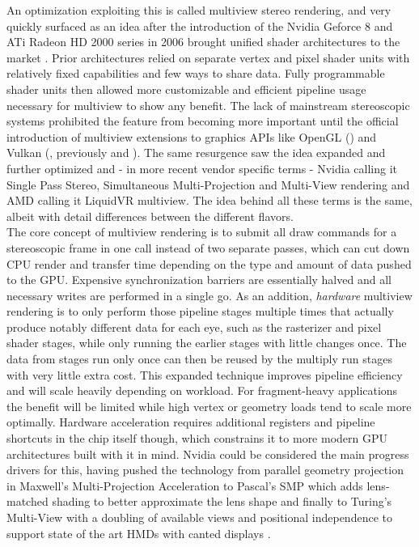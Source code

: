 An optimization exploiting this is called multiview stereo rendering, and very quickly surfaced as an idea after the introduction of the Nvidia Geforce 8 and ATi Radeon HD 2000 series in 2006 brought unified shader architectures to the market \cite{Lindholm.2008}\cite{Sommefeldt.2007}. Prior architectures relied on separate vertex and pixel shader units with relatively fixed capabilities and few ways to share data. Fully programmable shader units then allowed more customizable and efficient pipeline usage necessary for multiview to show any benefit. 
The lack of mainstream stereoscopic systems prohibited the feature from becoming more important until the official introduction of multiview extensions to graphics APIs like OpenGL () and Vulkan (, previously  and ). 
The same resurgence saw the idea expanded and further optimized and - in more recent vendor specific terms - Nvidia calling it Single Pass Stereo\cite{Cantlay.2016}, Simultaneous Multi-Projection\cite{Smith.2016} and Multi-View\cite{Bhonde.2018} rendering and AMD calling it LiquidVR multiview\cite{Gallagher.2016}\cite{Jez.2017}. The idea behind all these terms is the same, albeit with detail differences between the different flavors. \\

The core concept of multiview rendering is to submit all draw commands for a stereoscopic frame in one call instead of two separate passes, which can cut down CPU render and transfer time depending on the type and amount of data pushed to the GPU. Expensive synchronization barriers are essentially halved and all necessary writes are performed in a single go. 
As an addition, \textit{hardware} multiview rendering is to only perform those pipeline stages multiple times that actually produce notably different data for each eye, such as the rasterizer and pixel shader stages, while only running the earlier stages with little changes once. The data from stages run only once can then be reused by the multiply run stages with very little extra cost. This expanded technique improves pipeline efficiency and will scale heavily depending on workload. For fragment-heavy applications the benefit will be limited while high vertex or geometry loads tend to scale more optimally. Hardware acceleration requires additional registers and pipeline shortcuts in the chip itself though, which constrains it to more modern GPU architectures built with it in mind. Nvidia could be considered the main progress drivers for this, having pushed the technology from parallel geometry projection in Maxwell's Multi-Projection Acceleration to Pascal's SMP which adds lens-matched shading to better approximate the lens shape and finally to Turing's Multi-View with a doubling of available views and positional independence to support state of the art HMDs with canted displays \cite{Bhonde.2018}. 

